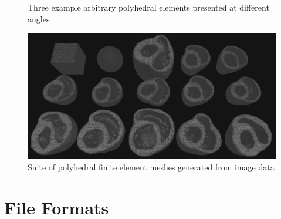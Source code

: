 \begin{figure}[ht]
{\label{fig:zoom5}}		

\caption{Three example arbitrary polyhedral elements presented at different angles}
\label{fig:zoom}
\end{figure}

\begin{figure}[ht]
\centering
\includegraphics[width=1.0\textwidth]{media/3-celeris/7-suite.png}
\caption{Suite of polyhedral finite element meshes generated from image data \vspace{1cm}}
\label{fig:celsuite}
\end{figure}

\section{File Formats}
\label{File Formats-MESH}